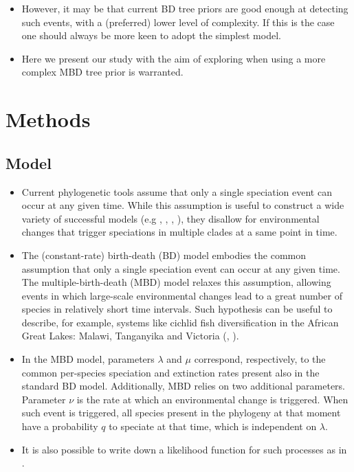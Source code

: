 \documentclass{article}
\begin{document}
\begin{itemize}
\item However, it may be that current BD tree priors are good enough at detecting such events, with a (preferred) lower level of complexity. If this is the case one should always be more keen to adopt the simplest model.

\item Here we present our study with the aim of exploring when using a more complex MBD tree prior is warranted.

\end{itemize}

\section{Methods}

\subsection{Model}
\begin{itemize}

\item Current phylogenetic tools assume that only a single speciation event can occur at any given time.
While this assumption is useful to construct a wide variety of successful 
models (e.g \cite{Maddison2007biSSE}, \cite{Valente2015}, \cite{etienne2012diversity}, \cite{etienne2014estimating}),
they disallow for environmental changes that trigger speciations in multiple clades at a same point in time. 

\item The (constant-rate) birth-death (BD) model embodies the common assumption that 
only a single speciation event can occur at any given time.
The multiple-birth-death (MBD) model relaxes this assumption, allowing events in which 
large-scale environmental changes lead to a great number of species 
in relatively short time intervals. Such hypothesis can be useful to describe, for example, 
systems like cichlid fish diversification in the 
African Great Lakes: Malawi, Tanganyika and Victoria (\cite{janzen2016}, \cite{janzen2017}).

\item In the MBD model, parameters $\lambda$ and $\mu$ correspond, respectively, 
to the common per-species speciation and extinction rates present also in the standard BD model. 
Additionally, MBD relies on two additional parameters. Parameter $\nu$ is the rate at which an environmental change is triggered.
When such event is triggered, all species present in the phylogeny at that moment
have a probability $q$ to speciate at that time, which is 
independent on $\lambda$. 

\item It is also possible to write down a likelihood function for such processes as in \cite{mbd}.
    
\end{itemize}
\end{document}
